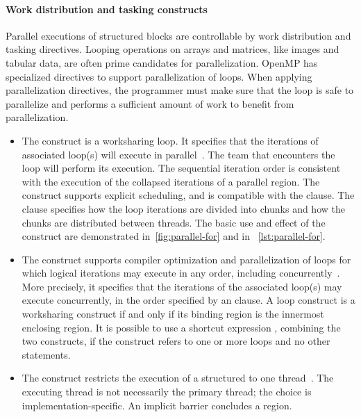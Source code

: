 \paragraph*{Work distribution and tasking constructs}
Parallel executions of structured blocks are controllable by work distribution and tasking directives.
Looping operations on arrays and matrices, like images and tabular data, are often prime candidates for parallelization.
OpenMP has specialized directives to support parallelization of loops.
When applying parallelization directives, the programmer must make sure that the loop is safe to parallelize and performs a sufficient amount of work to benefit from parallelization.

\begin{itemize}

\item The  construct is a worksharing loop.
It specifies that the iterations of associated loop(s) will execute in parallel~\cite[p. 416]{openmp_api}.
The team that encounters the loop will perform its execution.
The sequential iteration order is consistent with the execution of the collapsed iterations of a parallel  region.
The  construct supports \eg explicit scheduling, and is compatible with the  clause.
The  clause specifies how the loop iterations are divided into chunks and how the chunks are distributed between threads.
The basic use and effect of the  construct are demonstrated in~\autoref{fig:parallel-for} and in ~\autoref{lst:parallel-for}.

\item The  construct
supports compiler optimization and parallelization of loops for which logical iterations may execute in any order, including concurrently~\cite[p. 423--424]{openmp_api}.
More precisely, it specifies that the iterations of the associated loop(s) may execute concurrently, in the order specified by an  clause.
A loop construct is a worksharing construct if and only if its binding region is the innermost enclosing  region.
It is possible to use a shortcut expression , combining the two constructs, if the construct refers to one or more loops and no other statements.

\item The  construct restricts the execution of a structured to one thread~\cite[p. 405]{openmp_api}.
The executing thread is not necessarily the primary thread;
the choice is implementation-specific.
An implicit barrier concludes a  region.

\end{itemize}

